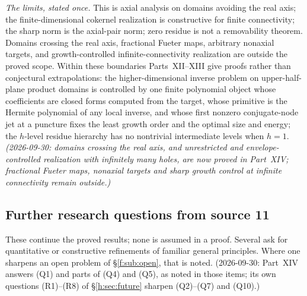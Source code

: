 \documentclass[11pt,a4paper]{article}
\numberwithin{equation}{section}
\theoremstyle{definition}
\theoremstyle{remark}
\theoremstyle{plain}
\begin{document}
\emph{The limits, stated once.} This is axial analysis on domains avoiding the
real axis; the finite-dimensional cokernel realization is constructive for
finite connectivity; the sharp norm is the axial-pair norm; zero residue is
not a removability theorem. Domains crossing the real axis, fractional
Fueter maps, arbitrary nonaxial targets, and growth-controlled
infinite-connectivity realization are outside the proved scope. Within these
boundaries Parts~XII--XIII give proofs rather than conjectural
extrapolations: the higher-dimensional inverse problem on upper-half-plane
product domains is controlled by one finite polynomial object whose
coefficients are closed forms computed from the target, whose primitive is
the Hermite polynomial of any local inverse, and whose first nonzero
conjugate-node jet at a puncture fixes the least growth order and the
optimal size and energy; the $h$-level residue hierarchy has no nontrivial
intermediate levels when $h=1$. \emph{(2026-09-30: domains crossing the real
axis, and unrestricted and envelope-controlled realization with infinitely
many holes, are now proved in Part~XIV; fractional Fueter maps, nonaxial
targets and sharp growth control at infinite connectivity remain outside.)}

\subsection{Further research questions from source 11}
\label{g:sub:questions-future}

These continue the proved results; none is assumed in a proof. Several ask
for quantitative or constructive refinements of familiar general principles.
Where one sharpens an open problem of \S\ref{f:sub:open}, that is noted.
(2026-09-30: Part~XIV answers (Q1) and parts of (Q4) and (Q5), as noted in
those items; its own questions (R1)--(R8) of \S\ref{h:sec:future} sharpen
(Q2)--(Q7) and (Q10).)
\end{document}
